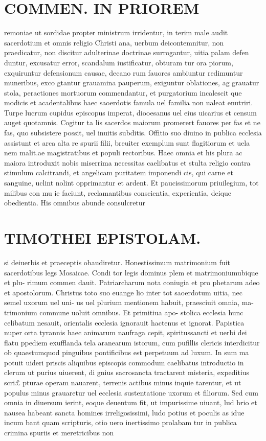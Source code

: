 \documentclass{article}
\begin{document}
\begin{pages}
\section*{COMMEN. IN PRIOREM }
\marginpar{[ p.70 ]}\pstart remoniae ut sordidae propter ministrum irridentur, in terim male audit sacerdotium et omnis religio Christi ana, uerbum deicontemnitur, non praedicatur, non discitur adulterinae doctrinae surrogantur, uitia palam defen duntur, excusatur error, scandalum iustificatur, obturam tur ora piorum, exquiruntur defensionum causae, decano rum fauores ambiuntur redimuntur muneribus, exco gtantur grauamina pauperum, exiguntur oblationes, ag grauatur stola, peractiones mortuorum commendantur, et purgatorium incalescit que modicis et acadentalibus haec saoerdotis famula uel familia non ualeat enutriri. Turpe lucrum cupidus episcopus imperat, diooesanus uel eius uicarius et censum auget quotamnis. Cogitur ta lis sacerdos maiorum promerert fauores per fas et ne fas, quo subsistere possit, uel inuitis subditis. Offitio suo diuino in publica ecclesia assistunt et arca alta re spurii filii, breuiter exemplum sunt flagitiorum et uela nem malit.ae magistratibus et populi rectoribus. Haec omnia et his plura ac maiora introduxit nobis miserrima necessitas caelibatus et stulta religio contra stimulum calcitrandi, et angelicam puritatem imponendi cis, qui carne et sanguine, uclint nolint opprimantur et ardent. Et paucissimorum priuilegium, tot milibus con mu ie faciunt, reclamantibus conscientia, experientia, deique obedientia. His omnibus abunde consulcretur  \pend
\section*{TIMOTHEI EPISTOLAM. }
\marginpar{[ p.71 ]}\pstart si deiuerbis et praeceptis obaudiretur. Honestissimum matrimonium fuit sacerdotibus legs Mosaicae. Condi tor legis dominus plem et matrimoniumubique et plu- rimum commen dauit. Patriarcharum nota coniugia et pro phetarum adeo et apostolorum. Christus toto suo euange lio inter tot saoerdotum uitia, nec semel uxorum uel uni- us uel plurium mentionem habuit, praesciuit omnia, ma- trimonium commune uoluit omnibus. Et primitiua apo- stolica ecclesia hunc celibatum nesauit, orientalis ecclesia ignorauit hactenus et ignorat. Papistica nuper orta tyrannis haec animarum naufraga cepit, spiritussancti et uerbi dei flatu ppediem exufflanda tela aranearum istorum, cum pufillis clericis interdicitur ob quaestumquod pinguibus pontificibus est perpetuum ad luxum. In sum ma potuit uideri priscis aliquibus episcopis commodum caelibatus introductio in clerum ut purius uiuerent, di gnius sacrosancta tractarent misteria, expeditius scri£ pturae operam nauarent, terrenis actibus minus inquie tarentur, et ut populus minus grauaretur uel ecclesia sustentatione uxorum et filiorum. Sed cum omnia in diuersum ierint, eoque deuentum fit, ut impurissime uiuant, lud brio et nausea habeant sancta homines irreligosissimi, ludo potius et poculis as idue incum bant quam scripturis, otio uero inertissimo prolabam tur in publica crimina spuriis et meretricibus non  \pend

\end{pages}
\end{document}

